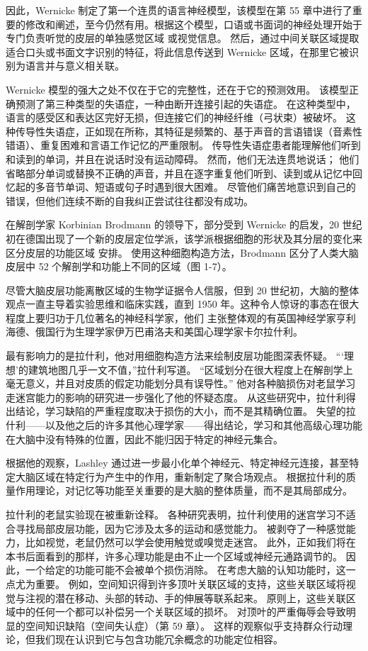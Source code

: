 因此，Wernicke 制定了第一个连贯的语言神经模型，该模型在第 55 章中进行了重要的修改和阐述，至今仍然有用。根据这个模型，口语或书面词的神经处理开始于专门负责听觉的皮层的单独感觉区域 或视觉信息。 然后，通过中间关联区域提取适合口头或书面文字识别的特征，将此信息传送到 Wernicke 区域，在那里它被识别为语言并与意义相关联。

Wernicke 模型的强大之处不仅在于它的完整性，还在于它的预测效用。 该模型正确预测了第三种类型的失语症，一种由断开连接引起的失语症。 在这种类型中，语言的感受区和表达区完好无损，但连接它们的神经纤维（弓状束）被破坏。 这种传导性失语症，正如现在所称，其特征是频繁的、基于声音的言语错误（音素性错语）、重复困难和言语工作记忆的严重限制。 传导性失语症患者能理解他们听到和读到的单词，并且在说话时没有运动障碍。 然而，他们无法连贯地说话； 他们省略部分单词或替换不正确的声音，并且在逐字重复他们听到、读到或从记忆中回忆起的多音节单词、短语或句子时遇到很大困难。 尽管他们痛苦地意识到自己的错误，但他们连续不断的自我纠正尝试往往都没有成功。

在解剖学家 Korbinian Brodmann 的领导下，部分受到 Wernicke 的启发，20 世纪初在德国出现了一个新的皮层定位学派，该学派根据细胞的形状及其分层的变化来区分皮层的功能区域 安排。 使用这种细胞构造方法，Brodmann 区分了人类大脑皮层中 52 个解剖学和功能上不同的区域（图 1-7）。

尽管大脑皮层功能离散区域的生物学证据令人信服，但到 20 世纪初，大脑的整体观点一直主导着实验思维和临床实践，直到 1950 年。这种令人惊讶的事态在很大程度上要归功于几位著名的神经科学家，他们 主张整体观的有英国神经学家亨利海德、俄国行为生理学家伊万巴甫洛夫和美国心理学家卡尔拉什利。

最有影响力的是拉什利，他对用细胞构造方法来绘制皮层功能图深表怀疑。 “‘理想’的建筑地图几乎一文不值，”拉什利写道。 “区域划分在很大程度上在解剖学上毫无意义，并且对皮质的假定功能划分具有误导性。” 他对各种脑损伤对老鼠学习走迷宫能力的影响的研究进一步强化了他的怀疑态度。 从这些研究中，拉什利得出结论，学习缺陷的严重程度取决于损伤的大小，而不是其精确位置。 失望的拉什利——以及他之后的许多其他心理学家——得出结论，学习和其他高级心理功能在大脑中没有特殊的位置，因此不能归因于特定的神经元集合。

根据他的观察，Lashley 通过进一步最小化单个神经元、特定神经元连接，甚至特定大脑区域在特定行为产生中的作用，重新制定了聚合场观点。 根据拉什利的质量作用理论，对记忆等功能至关重要的是大脑的整体质量，而不是其局部成分。

拉什利的老鼠实验现在被重新诠释。 各种研究表明，拉什利使用的迷宫学习不适合寻找局部皮层功能，因为它涉及太多的运动和感觉能力。 被剥夺了一种感觉能力，比如视觉，老鼠仍然可以学会使用触觉或嗅觉走迷宫。 此外，正如我们将在本书后面看到的那样，许多心理功能是由不止一个区域或神经元通路调节的。 因此，一个给定的功能可能不会被单个损伤消除。 在考虑大脑的认知功能时，这一点尤为重要。 例如，空间知识得到许多顶叶关联区域的支持，这些关联区域将视觉与注视的潜在移动、头部的转动、手的伸展等联系起来。 原则上，这些关联区域中的任何一个都可以补偿另一个关联区域的损坏。 对顶叶的严重侮辱会导致明显的空间知识缺陷（空间失认症）（第 59 章）。 这样的观察似乎支持群众行动理论，但我们现在认识到它与包含功能冗余概念的功能定位相容。

